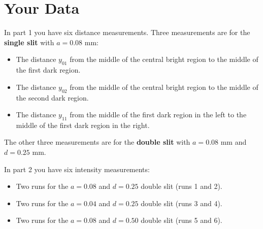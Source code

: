 \section{Your Data}
In part 1 you have six distance measurements. Three measurements are for the \textbf{single slit} with $a = 0.08$ mm:
\begin{itemize}
	\item The distance $y_{01}$ from the middle of the central bright region to the middle of the first dark region.
	\item The distance $y_{02}$ from the middle of the central bright region to the middle of the second dark region.
	\item The distance $y_{11}$ from the middle of the first dark region in the left to the middle of the first dark region in the right.
\end{itemize}
The other three measurements are for the \textbf{double slit} with $a = 0.08$ mm and $d = 0.25$ mm.

In part 2 you have six intensity measurements:
\begin{itemize}
	\item Two runs for the $a = 0.08$ and $d = 0.25$ double slit (runs 1 and 2).
	\item Two runs for the $a = 0.04$ and $d = 0.25$ double slit (runs 3 and 4).
	\item Two runs for the $a = 0.08$ and $d = 0.50$ double slit (runs 5 and 6).
\end{itemize}
